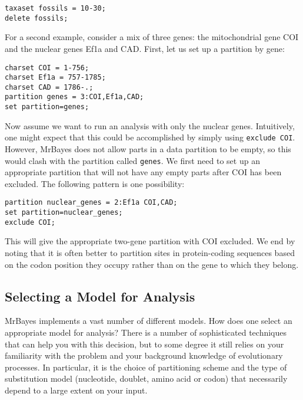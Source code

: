 \documentclass[12pt]{book}
\begin{document}
\begin{Verbatim}
taxaset fossils = 10-30;
delete fossils;
\end{Verbatim}

For a second example, consider a mix of three genes: the mitochondrial gene COI and the nuclear
genes Ef1a and CAD. First, let us set up a partition by gene:

\begin{Verbatim}
charset COI = 1-756;
charset Ef1a = 757-1785;
charset CAD = 1786-.;
partition genes = 3:COI,Ef1a,CAD;
set partition=genes;
\end{Verbatim}

Now assume we want to run an analysis with only the nuclear genes. Intuitively, one might expect
that this could be accomplished by simply using \texttt{exclude COI}. However, MrBayes does not
allow parts in a data partition to be empty, so this would clash with the partition called
\texttt{genes}.  We first need to set up an appropriate partition that will not have any empty
parts after COI has been excluded. The following pattern is one possibility:

\begin{Verbatim}
partition nuclear_genes = 2:Ef1a COI,CAD;
set partition=nuclear_genes;
exclude COI;
\end{Verbatim}

This will give the appropriate two-gene partition with COI excluded. We end by noting that it is
often better to partition sites in protein-coding sequences based on the codon position they occupy
rather than on the gene to which they belong.

\subsection{Selecting a Model for Analysis}

MrBayes implements a vast number of different models. How does one select an appropriate model for
analysis? There is a number of sophisticated techniques that can help you with this decision, but
to some degree it still relies on your familiarity with the problem and your background knowledge
of evolutionary processes. In particular, it is the choice of partitioning scheme and the type of
substitution model (nucleotide, doublet, amino acid or codon) that necessarily depend to a large
extent on your input.
\end{document}
